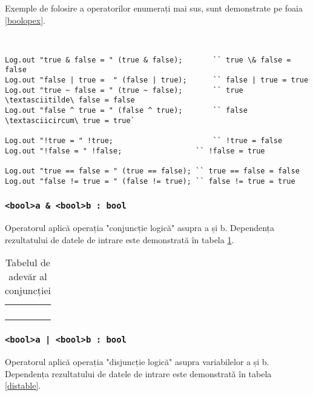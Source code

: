 Exemple de folosire a operatorilor enumerați mai sus, sunt demonstrate pe foaia \ref{boolopex}.

\

\begin{lstlisting}[caption=Exemple de folosite a operatorilor asupra tipului bool, label=boolopex]
Log.out "true & false = " (true & false);		`` true \& false = false
Log.out "false | true =  " (false | true);		`` false | true = true
Log.out "true ~ false = " (true ~ false);		`` true \textasciitilde\ false = false
Log.out "false ^ true = " (false ^ true);		`` false \textasciicircum\ true = true`

Log.out "!true = " !true;						`` !true = false
Log.out "!false = " !false;					`` !false = true

Log.out "true == false = " (true == false);	`` true == false = false
Log.out "false != true = " (false != true);	`` false != true = true
\end{lstlisting}

\subsubsection{\lstinline|<bool>a & <bool>b : bool|}

Operatorul aplică operația "conjuncție logică" asupra a și b. Dependența rezultatului de datele de intrare este demonstrată în tabela \ref{conjtable}.

\begin{table}[htb]
	\caption{Tabelul de adevăr al conjuncției}
	\label{conjtable}
	\begin{tabular}{|c|c|c|}
		\hline
		\code{a} & \code{b} & \code{a \& b} \\ \hline
		\false{} & \false{} & \false{}  	\\ \hline
		\false{} & \true{}  & \false{}  	\\ \hline
		\true{}  & \false{} & \false{}  	\\ \hline
		\true{}  & \true{}  & \true{}   	\\ \hline
	\end{tabular}
	\vspace{-2em}
\end{table}

\subsubsection{\lstinline`<bool>a | <bool>b : bool`}

Operatorul aplică operația "disjuncție logică" asupra variabilelor a și b. Dependența rezultatului de datele de intrare este demonstrată în tabela  \ref{distable}.

